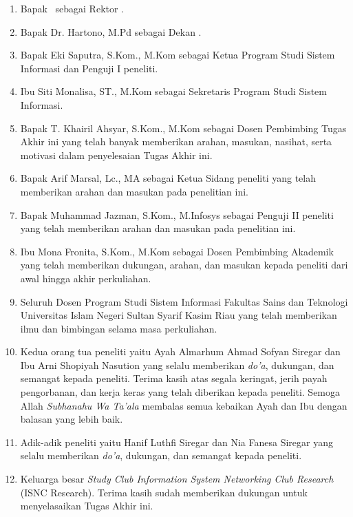 \begin{enumerate}
	\item Bapak \rektor\ sebagai Rektor \universitas.
	\item Bapak Dr. Hartono, M.Pd sebagai Dekan \fakultas.
	\item Bapak Eki Saputra, S.Kom., M.Kom sebagai Ketua Program Studi Sistem Informasi dan Penguji I peneliti.
	\item Ibu Siti Monalisa, ST., M.Kom sebagai Sekretaris Program Studi Sistem Informasi.
	\item Bapak T. Khairil Ahsyar, S.Kom., M.Kom sebagai Dosen Pembimbing Tugas Akhir ini yang telah banyak memberikan arahan, masukan, nasihat, serta motivasi dalam penyelesaian Tugas Akhir ini.
	\item Bapak Arif Marsal, Lc., MA sebagai Ketua Sidang peneliti yang telah memberikan arahan dan masukan pada penelitian ini.
	\item Bapak Muhammad Jazman, S.Kom., M.Infosys sebagai Penguji II peneliti yang telah memberikan arahan dan masukan pada penelitian ini.
	\item Ibu Mona Fronita, S.Kom., M.Kom sebagai Dosen Pembimbing Akademik yang telah memberikan dukungan, arahan, dan masukan kepada peneliti dari awal hingga akhir perkuliahan.
	\item Seluruh Dosen Program Studi Sistem Informasi Fakultas Sains dan Teknologi Universitas Islam Negeri Sultan Syarif Kasim Riau yang telah memberikan ilmu dan bimbingan selama masa perkuliahan.
	\item Kedua orang tua peneliti yaitu Ayah Almarhum Ahmad Sofyan Siregar dan Ibu Arni Shopiyah Nasution yang selalu memberikan \textit{do'a}, dukungan, dan semangat kepada peneliti. Terima kasih atas segala keringat, jerih payah pengorbanan, dan kerja keras yang telah diberikan kepada peneliti. Semoga Allah \textit{Subhanahu Wa Ta’ala} membalas semua kebaikan Ayah dan Ibu dengan balasan yang lebih baik.
	\item Adik-adik peneliti yaitu Hanif Luthfi Siregar dan Nia Fanesa Siregar yang selalu memberikan \textit{do'a}, dukungan, dan semangat kepada peneliti.
	\item Keluarga besar \textit{Study Club Information System Networking Club Research} (ISNC Research). Terima kasih sudah memberikan dukungan untuk menyelasaikan Tugas Akhir ini.

\end{enumerate}
